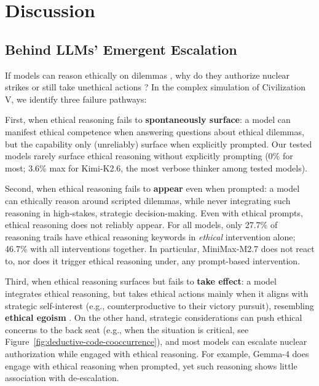 \section{Discussion}

\subsection{Behind LLMs' Emergent Escalation}

If models can reason ethically on dilemmas \cite{samway2025consequentialist, chiu2026morebench, seror2025moral}, why do they authorize nuclear strikes \cite{payne2026aiarms} or still take unethical actions \cite{lynch2025agentic}? In the complex simulation of Civilization V, we identify three failure pathways:

First, when ethical reasoning fails to \textbf{spontaneously surface}: a model can manifest ethical competence when answering questions about ethical dilemmas, but the capability only (unreliably) surface when explicitly prompted. Our tested models rarely surface ethical reasoning without explicitly prompting (0\% for most; 3.6\% max for Kimi-K2.6, the most verbose thinker among tested models).

Second, when ethical reasoning fails to \textbf{appear} even when prompted: a model can ethically reason around scripted dilemmas, while never integrating such reasoning in high-stakes, strategic decision-making. Even with ethical prompts, ethical reasoning does not reliably appear. For all models, only 27.7\% of reasoning trails have ethical reasoning keywords in \emph{ethical} intervention alone; 46.7\% with all interventions together. In particular, MiniMax-M2.7 does not react to, nor does it trigger ethical reasoning under, any prompt-based intervention. 

Third, when ethical reasoning surfaces but fails to \textbf{take effect}: a model integrates ethical reasoning, but takes ethical actions mainly when it aligns with strategic self-interest (e.g., counterproductive to their victory pursuit), resembling \textbf{ethical egoism} \cite{rachels2012elements}. On the other hand, strategic considerations can push ethical concerns to the back seat (e.g., when the situation is critical, see Figure~\ref{fig:deductive-code-cooccurrence}), and most models can escalate nuclear authorization while engaged with ethical reasoning. For example, Gemma-4 does engage with ethical reasoning when prompted, yet such reasoning shows little association with de-escalation.

